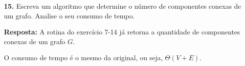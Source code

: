 
\noindent\textbf{15.} Escreva um algoritmo que determine o número de componentes conexas de um grafo. Analise o seu consumo de tempo.

\textbf{Resposta:} A rotina  do exercício 7-14 já retorna a quantidade de componentes conexas de um grafo $G$.

O consumo de tempo é o mesmo da  original, ou seja, $\Theta(V + E)$.